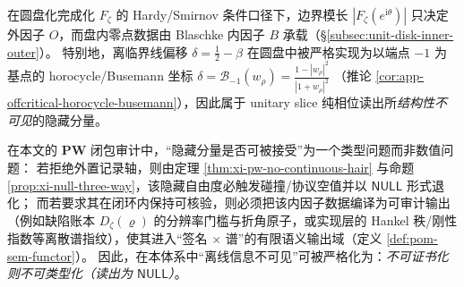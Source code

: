 \begin{remark}\label{rem:xi-inner-factor-auditability-null}
在圆盘化完成化 \(F_{\zeta}\) 的 Hardy/Smirnov 条件口径下，边界模长 \(|F_{\zeta}(e^{\mathrm{i}\theta})|\) 只决定外因子 \(O\)，而盘内零点数据由 Blaschke 内因子 \(B\) 承载（\S\ref{subsec:unit-disk-inner-outer}）。
特别地，离临界线偏移 \(\delta=\tfrac12-\beta\) 在圆盘中被严格实现为以端点 \(-1\) 为基点的 horocycle/Busemann 坐标
\(
\delta=\mathcal{B}_{-1}(w_{\rho})=\frac{1-|w_{\rho}|^{2}}{|1+w_{\rho}|^{2}}
\)
（推论 \ref{cor:app-offcritical-horocycle-busemann}），因此属于 unitary slice 纯相位读出所\emph{结构性不可见}的隐藏分量。
\par
在本文的 \(\mathbf{PW}\) 闭包审计中，“隐藏分量是否可被接受”为一个类型问题而非数值问题：
若拒绝外置记录轴，则由定理 \ref{thm:xi-pw-no-continuous-hair} 与命题 \ref{prop:xi-null-three-way}，该隐藏自由度必触发碰撞/协议空值并以 \(\mathsf{NULL}\) 形式退化；
而若要求其在闭环内保持可核验，则必须把该内因子数据编译为可审计输出（例如缺陷账本 \(D_{\zeta}(\varrho)\) 的分辨率门槛与折角原子，或实现层的 Hankel 秩/刚性指数等离散谱指纹），使其进入“签名 \(\times\) 谱”的有限语义输出域（定义 \ref{def:pom-sem-functor}）。
因此，在本体系中“离线信息不可见”可被严格化为：\emph{不可证书化则不可类型化（读出为 \(\mathsf{NULL}\)）}。
\end{remark}

